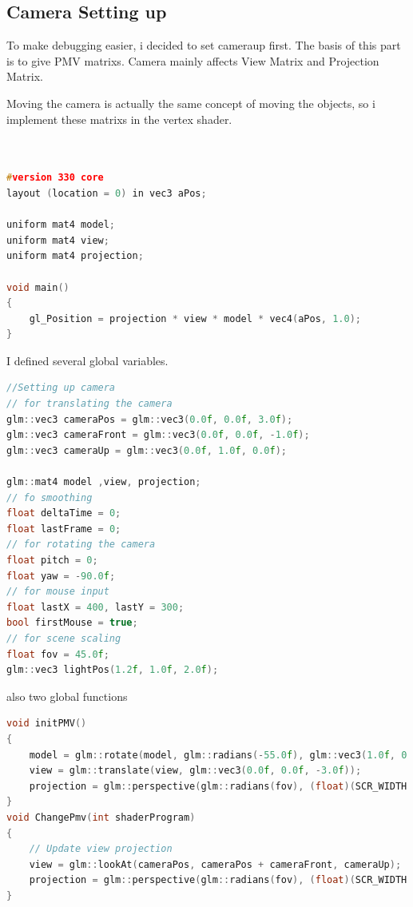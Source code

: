 \documentclass[acmtog]{acmart}
\begin{document}
\subsection{Camera Setting up}
To make debugging easier, i decided to set cameraup first. The basis of this part is to give PMV matrixs. Camera mainly affects View Matrix and Projection Matrix.
\par Moving the camera is actually the same concept of moving the objects, so i implement these matrixs in the vertex shader.\\\\\\
\begin{lstlisting}[frame=single,breaklines=true,language=c++,basicstyle=\footnotesize\ttfamily]
#version 330 core
layout (location = 0) in vec3 aPos;

uniform mat4 model;
uniform mat4 view;
uniform mat4 projection;

void main()
{
	gl_Position = projection * view * model * vec4(aPos, 1.0);
}
\end{lstlisting}
\par I defined several global variables.
\begin{lstlisting}[frame=single,breaklines=true,language=c++,basicstyle=\footnotesize\ttfamily]
//Setting up camera 
// for translating the camera
glm::vec3 cameraPos = glm::vec3(0.0f, 0.0f, 3.0f);
glm::vec3 cameraFront = glm::vec3(0.0f, 0.0f, -1.0f);
glm::vec3 cameraUp = glm::vec3(0.0f, 1.0f, 0.0f);

glm::mat4 model ,view, projection;
// fo smoothing 
float deltaTime = 0;
float lastFrame = 0;
// for rotating the camera
float pitch = 0;
float yaw = -90.0f;
// for mouse input 
float lastX = 400, lastY = 300;
bool firstMouse = true;
// for scene scaling 
float fov = 45.0f;
glm::vec3 lightPos(1.2f, 1.0f, 2.0f);
\end{lstlisting}
\par also two global functions
\begin{lstlisting}[frame=single,breaklines=true,language=c++,basicstyle=\footnotesize\ttfamily]
void initPMV()
{
	model = glm::rotate(model, glm::radians(-55.0f), glm::vec3(1.0f, 0.0f, 0.0f));
	view = glm::translate(view, glm::vec3(0.0f, 0.0f, -3.0f));
	projection = glm::perspective(glm::radians(fov), (float)(SCR_WIDTH / SCR_HEIGHT), 0.1f, 100.0f);
}
void ChangePmv(int shaderProgram)
{
	// Update view projection
	view = glm::lookAt(cameraPos, cameraPos + cameraFront, cameraUp);
	projection = glm::perspective(glm::radians(fov), (float)(SCR_WIDTH / SCR_HEIGHT), 0.1f, 100.0f);
}
\end{lstlisting}
\end{document}
